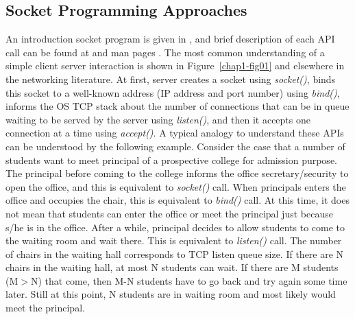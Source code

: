 \begin{multicols}{2}
\section{Socket Programming Approaches}

An introduction socket program is given in \cite{art1-key03} \cite{art1-key09}, and brief description of each API call can be found at \cite{art1-key08} and man pages \cite{art1-key10}.  The most common understanding of a simple client server interaction is shown in Figure~\ref{chap1-fig01} \cite{art1-key07} and elsewhere in the networking literature. At first, server creates a socket using \textit{socket()}, binds this socket to a well-known address (IP address and port number) using \textit{bind()}, informs the OS TCP stack about the number of connections that can be in queue waiting to be served by the server using \textit{listen()}, and then it accepts one connection at a time using \textit{accept()}. A typical analogy to understand these APIs can be understood by the following example. Consider the case that a number of students want to meet principal of a prospective college for admission purpose. The principal before coming to the college informs the office secretary/security to open the office, and this is equivalent to \textit{socket()} call. When principals enters the office and occupies the chair, this is equivalent to \textit{bind()} call. At this time, it does not mean that students can enter the office or meet the principal just because s/he is in the office. After a while, principal decides to allow students to come to the waiting room and wait there. This is equivalent to \textit{listen()} call. The number of chairs in the waiting hall corresponds to TCP listen queue size. If there are N chairs in the waiting hall, at most N students can wait. If there are M students (M$>$N) that come, then  M-N students have to go back and try again some time later. Still at this point, N students are in waiting room and most likely would meet the principal.


\end{multicols}
